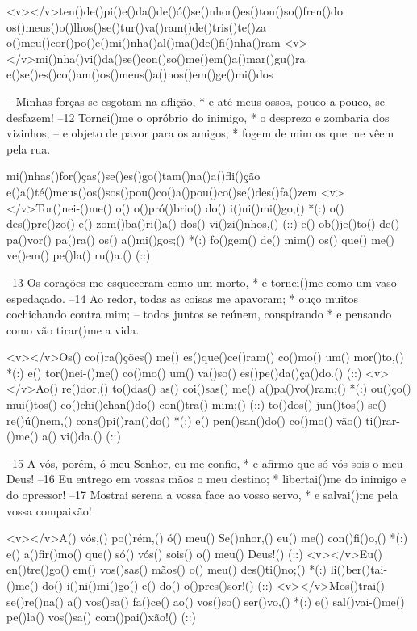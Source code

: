 <v></v>ten()de()pi()e()da()de()ó()se()nhor()es()tou()so()fren()do
os()meus()o()lhos()se()tur()va()ram()de()tris()te()za
o()meu()cor()po()e()mi()nha()al()ma()de()fi()nha()ram
<v></v>mi()nha()vi()da()se()con()so()me()em()a()mar()gu()ra
e()se()es()co()am()os()meus()a()nos()em()ge()mi()dos

– Minhas forças se esgotam na aflição, *
e até meus ossos, pouco a pouco, se desfazem!
–12 Tornei()me o opróbrio do inimigo, *
o desprezo e zombaria dos vizinhos,
– e objeto de pavor para os amigos; *
fogem de mim os que me vêem pela rua.

mi()nhas()for()ças()se()es()go()tam()na()a()fli()ção
e()a()té()meus()os()sos()pou()co()a()pou()co()se()des()fa()zem
<v></v>Tor()nei-()me() o() o()pró()brio() do() i()ni()mi()go,() *(:)
o() des()pre()zo() e() zom()ba()ri()a() dos() vi()zi()nhos,() (::)
e() ob()je()to() de() pa()vor() pa()ra() os() a()mi()gos;() *(:)
fo()gem() de() mim() os() que() me() ve()em() pe()la() ru()a.() (::)

–13 Os corações me esqueceram como um morto, *
e tornei()me como um vaso espedaçado.
–14 Ao redor, todas as coisas me apavoram; *
ouço muitos cochichando contra mim;
– todos juntos se reúnem, conspirando *
e pensando como vão tirar()me a vida.

<v></v>Os() co()ra()ções() me() es()que()ce()ram() co()mo() um() mor()to,() *(:)
e() tor()nei-()me() co()mo() um() va()so() es()pe()da()ça()do.() (::)
<v></v>Ao() re()dor,() to()das() as() coi()sas() me() a()pa()vo()ram;() *(:)
ou()ço() mui()tos() co()chi()chan()do() con()tra() mim;() (::)
to()dos() jun()tos() se() re()ú()nem,() cons()pi()ran()do() *(:)
e() pen()san()do() co()mo() vão() ti()rar-()me() a() vi()da.() (::)

–15 A vós, porém, ó meu Senhor, eu me confio, *
e afirmo que só vós sois o meu Deus!
–16 Eu entrego em vossas mãos o meu destino; *
libertai()me do inimigo e do opressor!
–17 Mostrai serena a vossa face ao vosso servo, *
e salvai()me pela vossa compaixão!

<v></v>A() vós,() po()rém,() ó() meu() Se()nhor,() eu() me() con()fi()o,() *(:)
e() a()fir()mo() que() só() vós() sois() o() meu() Deus!() (::)
<v></v>Eu() en()tre()go() em() vos()sas() mãos() o() meu() des()ti()no;() *(:)
li()ber()tai-()me() do() i()ni()mi()go() e() do() o()pres()sor!() (::)
<v></v>Mos()trai() se()re()na() a() vos()sa() fa()ce() ao() vos()so() ser()vo,() *(:)
e() sal()vai-()me() pe()la() vos()sa() com()pai()xão!() (::)

